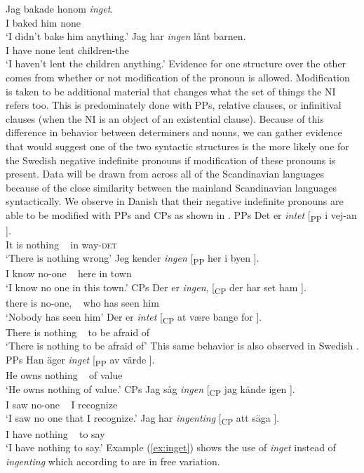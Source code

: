 \documentclass[12pt, letterpaper]{article}
\begin{document}
		\ea 
		\gll Jag bakade honom \emph{inget}.\\
		I baked him none\\
		\glt `I didn't bake him anything.'
		\ex 
		\gll  Jag har \textit{ingen} lånt barnen.\\
		I have none lent children-the\\
		\glt `I haven't lent the children anything.'
		\z 
	\z
\ex Evidence for one structure over the other comes from whether or not modification of the pronoun is allowed. 
	\ea Modification is taken to be additional material that changes what the set of things the NI refers too. 
	\ex This is predominately done with PPs, relative clauses, or infinitival clauses (when the NI is an object of an existential clause).
	\z 
\ex Because of this difference in behavior between determiners and nouns, we can gather evidence that would suggest one of the two syntactic structures is the more likely one for the Swedish negative indefinite pronouns if modification of these pronouns is present.
\ex Data will be drawn from across all of the Scandinavian languages because of the close similarity between the mainland Scandinavian languages syntactically.
\ex We observe in Danish that their negative indefinite pronouns are able to be modified with PPs and CPs as shown in \citet[218ff]{allanDanishComprehensiveGrammar1995}.
	\ea PPs
		\ea 
		\gll Det er \textit{intet} [\textsubscript{PP} i vej-an ].\\
			It is nothing ~ in way-\textsc{det}\\
		\glt `There is nothing wrong'
		\ex 
		\gll Jeg kender \textit{ingen} [\textsubscript{PP} her i byen ].\\
			I know no-one ~ here in town\\
		\glt `I know no one in this town.'
		\z
	\ex CPs
		\ea 
		\gll Der er \textit{ingen}, [\textsubscript{CP} der har set ham ].\\
		there is no-one, ~ who has seen him\\
		\glt `Nobody has seen him'
		\ex
		\gll Der er \textit{intet} [\textsubscript{CP} at være bange for ].\\
		There is nothing ~ to be afraid of\\
		\glt `There is nothing to be afraid of'
		\z 
	\z
\ex This same behavior is also observed in Swedish \citep[197ff]{holmesSwedishComprehensiveGrammar2013}.
	\ea PPs
		\ea \label{ex:inget}
		\gll Han äger \textit{inget} [\textsubscript{PP} av värde ].\\
			He owns nothing ~ of value\\
		\glt `He owns nothing of value.'
		\z 
	\ex CPs
		\ea
		\gll Jag såg \textit{ingen} [\textsubscript{CP} jag {kände igen} ].\\
		I saw no-one ~ I recognize\\
		\glt `I saw no one that I recognize.'
		\ex 
		\gll Jag har \textit{ingenting} [\textsubscript{CP} att säga ].\\
		I have nothing ~ to say\\
		\glt `I have nothing to say.'
		\z 
	\z
\ex Example (\ref{ex:inget}) shows the use of \textit{inget} instead of \textit{ingenting} which according to \citet{holmesSwedishComprehensiveGrammar2013} are in free variation.
\end{document}
